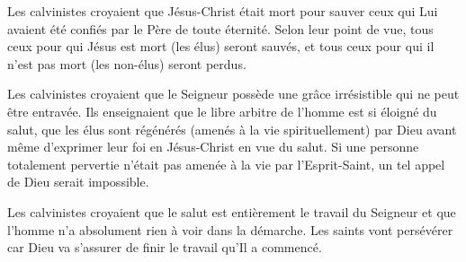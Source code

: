 
\begin{pocketpar}{}
Les calvinistes croyaient que Jésus-Christ était mort pour sauver
 ceux qui Lui avaient été confiés par le Père de toute éternité.
 Selon leur point de vue, tous ceux pour qui Jésus est mort (les élus) seront sauvés,
 et tous ceux pour qui il n'est pas mort (les non-élus) seront \mbox{perdus}.
\end{pocketpar}


\begin{pocketpar}{}
Les calvinistes croyaient que le Seigneur possède une grâce irrésistible
 qui ne peut être entravée. Ils enseignaient que le libre arbitre de l'hom\-me
 est si éloigné du salut, que les élus sont régénérés (amenés à la vie spirituellement)
 par Dieu avant
 même d'exprimer leur foi en Jésus-Christ en vue du salut.
 Si une per\-son\-ne totalement pervertie n'était pas amenée à la vie par l'Esprit-Saint,
 un tel appel de Dieu serait impossible.
\end{pocketpar}


Les calvinistes croyaient que le
 salut est entièrement le travail du Seigneur
 et que l'homme n'a absolument rien à voir dans la démarche.
 Les saints vont persévérer car Dieu va s'as\-surer de finir le travail
 qu'Il a commencé.


